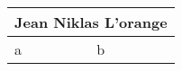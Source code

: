 \documentclass[10pt,a4paper,onepage]{article}
\begin{document}
\begin{tabularx}{\textwidth}{|X|X|} \hline
  \multicolumn{2}{|c|}{\bf Jean Niklas L'orange} \\ \hline
  a & b \\ \hline
\end{tabularx}
\end{document}
